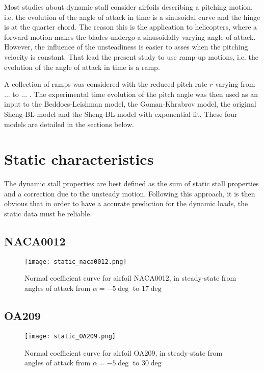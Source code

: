 Most studies about dynamic stall consider airfoils describing a pitching motion, i.e. the evolution of the angle of attack in time is a sinusoidal curve and the hinge is at the quarter chord. The reason this is the application to helicopters, where a forward motion makes the blades undergo a sinusoidally varying angle of attack. However, the influence of the unsteadiness is easier to asses when the pitching velocity is constant. That lead the present study to use ramp-up motions, i.e. the evolution of the angle of attack in time is a ramp. 

A collection of ramps was considered with the reduced pitch rate $r$ varying from ... to ... . The experimental time evolution of the pitch angle was then used as an input to the Beddoes-Leishman model, the Goman-Khrabrov model, the original Sheng-BL model and the Sheng-BL model with exponential fit. These four models are detailed in the sections below. 

\section{Static characteristics}

The dynamic stall properties are best defined as the sum of static stall properties and a correction due to the unsteady motion. Following this approach, it is then obvious that in order to have a accurate prediction for the dynamic loads, the static data must be reliable. 

\subsection{NACA0012}

\begin{figure}[h]
\centering
\texttt{[image: static\_naca0012.png]}
\caption{Normal coefficient curve for airfoil NACA0012, in steady-state from angles of attack from $\alpha=-5 \deg$ to $17 \deg$}
\label{fig:static_flatplate}
\end{figure}


\subsection{OA209}

\begin{figure}[h]
\centering
\texttt{[image: static\_OA209.png]}
\caption{Normal coefficient curve for airfoil OA209, in steady-state from angles of attack from $\alpha=-5 \deg$ to $30 \deg$}
\label{fig:static_flatplate}
\end{figure}

